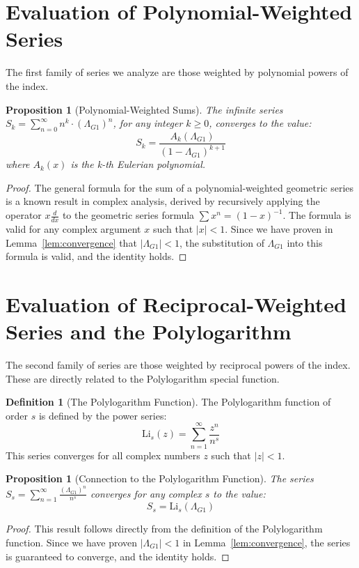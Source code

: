 \documentclass{amsart}
\theoremstyle{plain}
\newtheorem{proposition}[theorem]{Proposition}
\theoremstyle{definition}
\newtheorem{definition}[theorem]{Definition}
\theoremstyle{remark}
\newcommand{\LambdaG}{\Lambda_{G1}}
\begin{document}
\section{Evaluation of Polynomial-Weighted Series}
The first family of series we analyze are those weighted by polynomial powers of the index.

\begin{proposition}[Polynomial-Weighted Sums]
The infinite series $S_k = \sum_{n=0}^{\infty} n^k \cdot (\LambdaG)^n$, for any integer $k \ge 0$, converges to the value:
$$S_k = \frac{A_k(\LambdaG)}{(1-\LambdaG)^{k+1}}$$
where $A_k(x)$ is the k-th Eulerian polynomial.
\end{proposition}
\begin{proof}
The general formula for the sum of a polynomial-weighted geometric series is a known result in complex analysis, derived by recursively applying the operator $x \frac{d}{dx}$ to the geometric series formula $\sum x^n = (1-x)^{-1}$. The formula is valid for any complex argument $x$ such that $|x|<1$. Since we have proven in Lemma~\ref{lem:convergence} that $|\LambdaG|<1$, the substitution of $\LambdaG$ into this formula is valid, and the identity holds.
\end{proof}

\section{Evaluation of Reciprocal-Weighted Series and the Polylogarithm}
The second family of series are those weighted by reciprocal powers of the index. These are directly related to the Polylogarithm special function.

\begin{definition}[The Polylogarithm Function]
The Polylogarithm function of order $s$ is defined by the power series:
$$ \mathrm{Li}_s(z) = \sum_{n=1}^{\infty} \frac{z^n}{n^s} $$
This series converges for all complex numbers $z$ such that $|z|<1$.
\end{definition}

\begin{proposition}[Connection to the Polylogarithm Function]
The series $S_s = \sum_{n=1}^{\infty} \frac{(\LambdaG)^{n}}{n^s}$ converges for any complex $s$ to the value:
$$S_s = \mathrm{Li}_s(\LambdaG)$$
\end{proposition}
\begin{proof}
This result follows directly from the definition of the Polylogarithm function. Since we have proven $|\LambdaG| < 1$ in Lemma~\ref{lem:convergence}, the series is guaranteed to converge, and the identity holds.
\end{proof}
\end{document}
